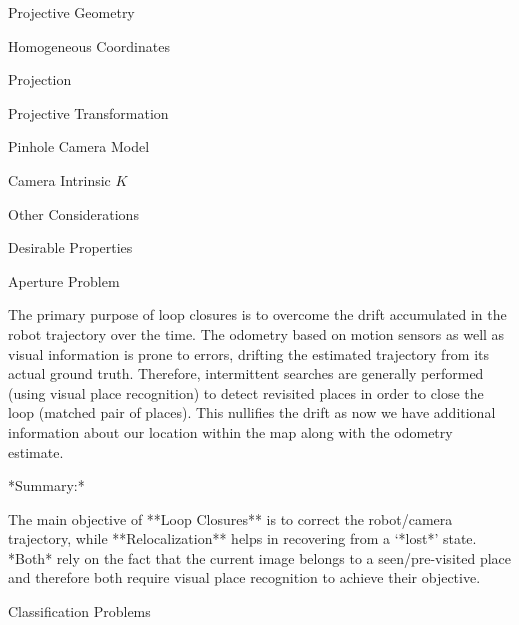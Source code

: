 \begin{section}
\begin{subsubsection}
\begin{subsubsection}
\begin{subsubsection}
\begin{section}{Projective Geometry}
\begin{subsection}{Homogeneous Coordinates}
\begin{subsubsection}
{\begin{subsubsection}{Projection}
\begin{subsubsection}{Projective Transformation}
\begin{subsection}
\begin{subsubsection}
\begin{subsubsection}
\begin{subsubsection}
{\begin{subsubsection}
\begin{subsection}
\begin{subsection} {Pinhole Camera Model}
\begin{subsection} {Camera Intrinsic $K$}
\begin{subsection}
\begin{subsection}
\begin{subsubsection}{Other Considerations}
{\begin{subsection}
\begin{subsubsection}{Desirable Properties}
\begin{section}
\begin{subsection}
\begin{subsection}
\begin{subsection}
\begin{section}
\begin{subsection}
\begin{subsubsection}
\begin{subsubsection}
\begin{subsection}
\begin{section}
\begin{subsection}
\begin{subsubsection}{Aperture Problem}
\begin{subsubsection}
{\begin{section}
\begin{subsubsection}
\begin{subsubsection}
\begin{subsubsection}
\begin{subsection}
\begin{subsection}
\begin{subsection}
\begin{subsection}
\begin{subsection}
\begin{subsection}
\begin{subsection}
\begin{subsubsection}
{\begin{subsubsection}
{\begin{subsubsection}
The primary purpose of loop closures is to overcome the drift accumulated in the robot trajectory over the time. The odometry based on motion sensors as well as visual information is prone to errors, drifting the estimated trajectory from its actual ground truth. Therefore, intermittent searches are generally performed (using visual place recognition) to detect revisited places in order to close the loop (matched pair of places). This nullifies the drift as now we have additional information about our location within the map along with the odometry estimate.

*Summary:*

The main objective of **Loop Closures** is to correct the robot/camera trajectory, while **Relocalization** helps in recovering from a ‘*lost*’ state. *Both* rely on the fact that the current image belongs to a seen/pre-visited place and therefore both require visual place recognition to achieve their objective.








\begin{section}Classification Problems


\end{section}
\end{subsubsection}}
\end{subsubsection}}
\end{subsubsection}
\end{subsection}
\end{subsection}
\end{subsection}
\end{subsection}
\end{subsection}
\end{subsection}
\end{subsection}
\end{subsubsection}
\end{subsubsection}
\end{subsubsection}
\end{section}}
\end{subsubsection}
\end{subsubsection}
\end{subsection}
\end{section}
\end{subsection}
\end{subsubsection}
\end{subsubsection}
\end{subsection}
\end{section}
\end{subsection}
\end{subsection}
\end{subsection}
\end{section}
\end{subsubsection}
\end{subsection}}
\end{subsubsection}
\end{subsection}
\end{subsection}
\end{subsection}
\end{subsection}
\end{subsection}
\end{subsubsection}}
\end{subsubsection}
\end{subsubsection}
\end{subsubsection}
\end{subsection}
\end{subsubsection}
\end{subsubsection}}
\end{subsubsection}
\end{subsection}
\end{section}
\end{subsubsection}
\end{subsubsection}
\end{subsubsection}
\end{section}
